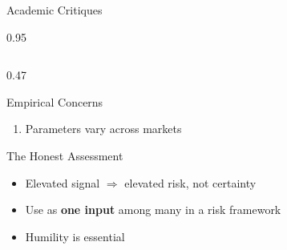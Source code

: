 \documentclass[9pt, aspectratio=169, t]{beamer}
\begin{document}
\begin{frame}{Academic Critiques}
\begin{cminipage}{0.95\textwidth}
{\begin{columns}[T]
\begin{column}{0.47\textwidth}
\begin{alertblock}{Empirical Concerns}
\begin{enumerate}
                    \item Parameters vary across markets
                \end{enumerate}
            \end{alertblock}
            \vspace{-2mm}
            \begin{block}{The Honest Assessment}
                \begin{itemize}\setlength{\itemsep}{0pt}
                    \item Elevated signal $\Rightarrow$ elevated risk, not certainty
                    \item Use as \textbf{one input} among many in a risk framework
                    \item Humility is essential
                \end{itemize}
            \end{block}
        \end{column}
    \end{columns}
    }
    \end{cminipage}
\end{frame}
\end{document}
